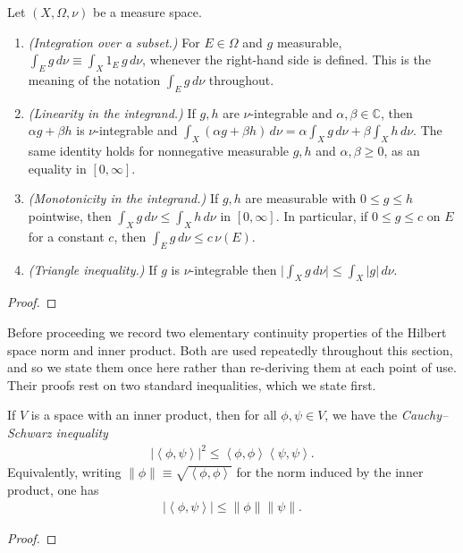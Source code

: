 \begin{proposition}
    \label{prpstn:basic-integral-properties}
    \leanok
    Let $(X,\Omega,\nu)$ be a measure space.
    \begin{enumerate}
        \item \textit{(Integration over a subset.)} For $E \in \Omega$ and $g$ measurable, $\int_E g \, d\nu \equiv \int_X 1_E\,g \, d\nu$, whenever the right-hand side is defined. This is the meaning of the notation $\int_E g\,d\nu$ throughout.
        \item \textit{(Linearity in the integrand.)} If $g,h$ are $\nu$-integrable and $\alpha,\beta\in\mathbb{C}$, then $\alpha g + \beta h$ is $\nu$-integrable and $\int_X (\alpha g + \beta h)\,d\nu = \alpha\int_X g\,d\nu + \beta\int_X h\,d\nu$. The same identity holds for nonnegative measurable $g,h$ and $\alpha,\beta \ge 0$, as an equality in $[0,\infty]$.
        \item \textit{(Monotonicity in the integrand.)} If $g,h$ are measurable with $0 \le g \le h$ pointwise, then $\int_X g\,d\nu \le \int_X h\,d\nu$ in $[0,\infty]$. In particular, if $0 \le g \le c$ on $E$ for a constant $c$, then $\int_E g\,d\nu \le c\,\nu(E)$.
        \item \textit{(Triangle inequality.)} If $g$ is $\nu$-integrable then $\lvert \int_X g\,d\nu \rvert \le \int_X \lvert g \rvert\,d\nu$.
    \end{enumerate}
\end{proposition}
\begin{proof}
\leanok
\end{proof}

Before proceeding we record two elementary continuity properties of the Hilbert space norm and inner product. Both are used repeatedly throughout this section, and so we state them once here rather than re-deriving them at each point of use. Their proofs rest on two standard inequalities, which we state first.

\begin{proposition}
    \label{prpstn:hall-a.43}
    \leanok
    If $V$ is a space with an inner product, then for all $\phi, \psi \in V$, we have the \textit{Cauchy–Schwarz inequality}
    \begin{align}
        \lvert \left< \phi, \psi \right> \rvert^2 \le \left< \phi, \phi \right> \left< \psi, \psi \right>.
    \end{align}
    Equivalently, writing $\left\| \phi \right\| \equiv \sqrt{\left< \phi, \phi \right>}$ for the norm induced by the inner product, one has
    \begin{align}
        \lvert \left< \phi, \psi \right> \rvert \le \left\| \phi \right\| \left\| \psi \right\|.
    \end{align}
\end{proposition}
\begin{proof}
\leanok
\end{proof}

